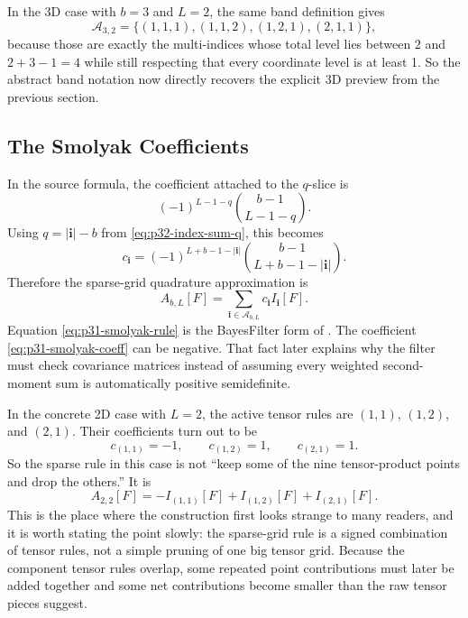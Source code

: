 \documentclass[11pt]{article}
\numberwithin{equation}{section}
\begin{document}
In the 3D case with \(b=3\) and \(L=2\), the same band definition gives
\begin{equation}
  \mathcal A_{3,2}
  =
  \{(1,1,1),(1,1,2),(1,2,1),(2,1,1)\},
  \label{eq:p38-A32}
\end{equation}
because those are exactly the multi-indices whose total level lies between
\(2\) and \(2+3-1=4\) while still respecting that every coordinate level is at
least 1.  So the abstract band notation now directly recovers the explicit 3D
preview from the previous section.

\subsection{The Smolyak Coefficients}
\label{subsec:p32-smolyak-coefficients}

In the source formula, the coefficient attached to the \(q\)-slice is
\[
  (-1)^{L-1-q}\binom{b-1}{L-1-q}.
\]
Using \(q=|\mathbf i|-b\) from \eqref{eq:p32-index-sum-q}, this becomes
\begin{equation}
  c_{\mathbf i}
  =
  (-1)^{L+b-1-|\mathbf i|}
  \binom{b-1}{L+b-1-|\mathbf i|}.
  \label{eq:p31-smolyak-coeff}
\end{equation}
Therefore the sparse-grid quadrature approximation is
\begin{equation}
  A_{b,L}[F]
  =
  \sum_{\mathbf i\in\mathcal A_{b,L}}
  c_{\mathbf i}I_{\mathbf i}[F].
  \label{eq:p31-smolyak-rule}
\end{equation}
Equation \eqref{eq:p31-smolyak-rule} is the BayesFilter form of
\citet[Eq. 26--29]{jia2012sparsegrid}.  The coefficient
\eqref{eq:p31-smolyak-coeff} can be negative.  That fact later explains why
the filter must check covariance matrices instead of assuming every weighted
second-moment sum is automatically positive semidefinite.

In the concrete 2D case with \(L=2\), the active tensor rules are
\((1,1)\), \((1,2)\), and \((2,1)\).  Their coefficients turn out to be
\begin{equation}
  c_{(1,1)}=-1,
  \qquad
  c_{(1,2)}=1,
  \qquad
  c_{(2,1)}=1.
  \label{eq:p36-2d-smolyak-coeffs}
\end{equation}
So the sparse rule in this case is not ``keep some of the nine tensor-product
points and drop the others.''  It is
\begin{equation}
  A_{2,2}[F] = -I_{(1,1)}[F] + I_{(1,2)}[F] + I_{(2,1)}[F].
  \label{eq:p36-2d-smolyak-rule}
\end{equation}
This is the place where the construction first looks strange to many readers,
and it is worth stating the point slowly: the sparse-grid rule is a signed
combination of tensor rules, not a simple pruning of one big tensor grid.
Because the component tensor rules overlap, some repeated point contributions
must later be added together and some net contributions become smaller than the
raw tensor pieces suggest.
\end{document}
